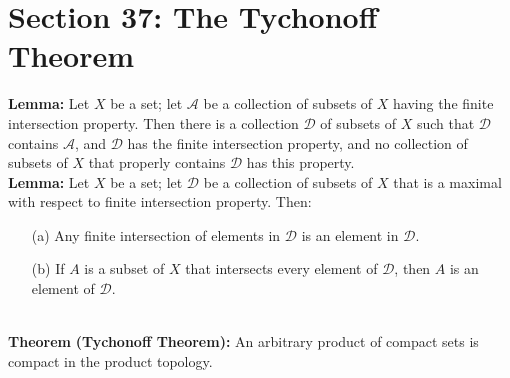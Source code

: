 \documentclass[12pt]{amsart}
\newcommand{\thm}{\textbf{Theorem }}
\newcommand{\lem}{\textbf{Lemma: }}
\begin{document}
\pagebreak
\section*{Section 37: The Tychonoff Theorem}
\indent \lem Let $X$ be a set; let $\mathcal{A}$ be a collection of subsets of $X$ having the finite intersection property. Then there is a collection $\mathcal{D}$ of subsets of $X$ such that $\mathcal{D}$ contains $\mathcal{A}$, and $\mathcal{D}$ has the finite intersection property, and no collection of subsets of $X$ that properly contains $\mathcal{D}$ has this property.\\
\indent \lem Let $X$ be a set; let $\mathcal{D}$ be a collection of subsets of $X$ that is a maximal with respect to finite intersection property. Then:\\
\begin{itemize}
    \item[(a)] Any finite intersection of elements in $\mathcal{D}$ is an element in $\mathcal{D}$.
    \item[(b)] If $A$ is a subset of $X$ that intersects every element of $\mathcal{D}$, then $A$ is an element of $\mathcal{D}$.
\end{itemize}\phantom{a}\\
\indent \thm \textbf{(Tychonoff Theorem):} An arbitrary product of compact sets is compact in the product topology.
\end{document}
